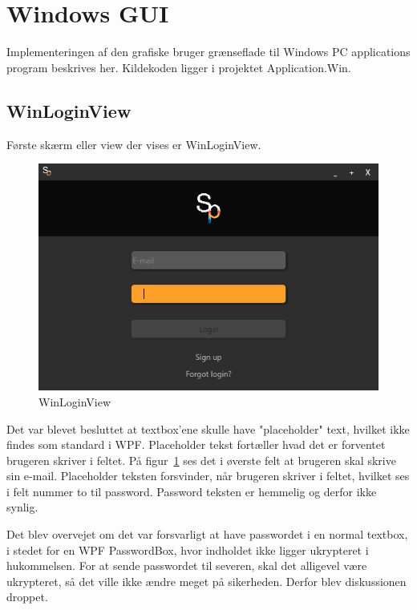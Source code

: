 \section{Windows GUI}
Implementeringen af den grafiske bruger grænseflade til Windows PC applications program beskrives her.
Kildekoden ligger i projektet Application.Win.
\subsection{WinLoginView}
Første skærm eller view der vises er WinLoginView.
\begin{figure}
	\centering
	\includegraphics[width=0.7\linewidth]{figs/implementering/winloginview}
	\caption{WinLoginView}
	\label{fig:winloginview}
\end{figure}
Det var blevet besluttet at textbox'ene skulle have "placeholder" text, hvilket ikke findes som standard i WPF. Placeholder tekst fortæller hvad det er forventet brugeren skriver i feltet. På figur~\ref{fig:winloginview} ses det i øverste felt at brugeren skal skrive sin e-mail. Placeholder teksten forsvinder, når brugeren skriver i feltet, hvilket ses i felt nummer to til password. Password teksten er hemmelig og derfor ikke synlig. 

Det blev overvejet om det var forsvarligt at have passwordet i en normal textbox, i stedet for en WPF PasswordBox, hvor indholdet ikke ligger ukrypteret i hukommelsen. 
For at sende passwordet til severen, skal det alligevel være ukrypteret, så det ville ikke ændre meget på sikerheden. Derfor blev diskussionen droppet.

